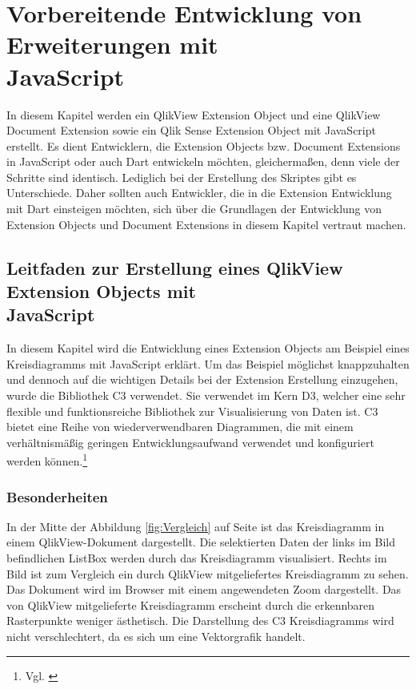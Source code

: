 \section{Vorbereitende Entwicklung von Erweiterungen mit \\JavaScript}
\label{lab:VorbereitendeEntwicklungVonErweiterungenMitJavaScript} 

In diesem Kapitel werden ein QlikView Extension Object und eine QlikView Document Extension sowie ein Qlik Sense Extension Object mit JavaScript erstellt. Es dient Entwicklern, die Extension Objects bzw. Document Extensions in JavaScript oder auch Dart entwickeln möchten, gleichermaßen, denn viele der Schritte sind identisch. Lediglich bei der Erstellung des Skriptes gibt es Unterschiede. Daher sollten auch Entwickler, die in die Extension Entwicklung mit Dart einsteigen möchten, sich über die Grundlagen der Entwicklung von Extension Objects und Document Extensions in diesem Kapitel vertraut machen.

\subsection{Leitfaden zur Erstellung eines QlikView Extension Objects mit \\JavaScript}
\label{lab:LeitfadenZurErstellungEinesExtensionObjectsMitJavaScript} 

In diesem Kapitel wird die Entwicklung eines Extension Objects am Beispiel eines Kreis\-diagramms mit JavaScript erklärt. Um das Beispiel möglichst knappzuhalten und dennoch auf die wichtigen Details bei der Extension Erstellung einzugehen, wurde die Bibliothek C3 verwendet. Sie verwendet im Kern D3, welcher eine sehr flexible und funktionsreiche Bibliothek zur Visualisierung von Daten ist. C3 bietet eine Reihe von wiederverwendbaren Diagrammen, die mit einem verhältnismäßig geringen Entwicklungsaufwand verwendet und konfiguriert werden können.\footnote{Vgl. \cite{C3D3BasedReusableChartLibrary}}

\subsubsection{Besonderheiten}

In der Mitte der Abbildung \ref{fig:Vergleich} auf Seite \pageref{fig:Vergleich} ist das Kreisdiagramm in einem QlikView-Dokument dargestellt. Die selektierten Daten der links im Bild befindlichen ListBox werden durch das Kreisdiagramm visualisiert. Rechts im Bild ist zum Vergleich ein durch QlikView mitgeliefertes Kreisdiagramm zu sehen. Das Dokument wird im Browser mit einem angewendeten Zoom dargestellt. Das von QlikView mitgelieferte Kreisdiagramm erscheint durch die erkennbaren Rasterpunkte weniger ästhetisch. Die Darstellung des C3 Kreis\-diagramms wird nicht verschlechtert, da es sich um eine Vektorgrafik handelt.

